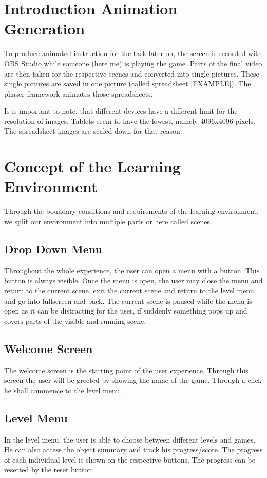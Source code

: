 \section{Introduction Animation Generation}\label{sec:introduction-animation-generation}
To produce animated instruction for the task later on,
the screen is recorded with OBS Studio while someone (here me) is playing the game.
Parts of the final video are then taken for the respective scenes and converted into single pictures.
These single pictures are saved in one picture (called spreadsheet [EXAMPLE]).
The phaser framework animates those spreadsheets.

Is is important to note, that different devices have a different limit for the resolution of images.
Tablets seem to have the lowest, namely 4096x4096 pixels.
The spreadsheet images are scaled down for that reason.

\section{Concept of the Learning Environment}\label{sec:concept-of-the-learning-environment}
Through the boundary conditions and requirements of the learning environment,
we split our environment into multiple parts or here called scenes.

\subsection{Drop Down Menu}\label{subsec:drop-down-menu}
Throughout the whole experience, the user can open a menu with a button.
This button is always visible.
Once the menu is open, the user may close the menu and return to the current scene,
exit the current scene and return to the level menu and go into fullscreen and back.
The current scene is paused while the menu is open as it can be distracting for the user,
if suddenly something pops up and covers parts of the visible and running scene.

\subsection{Welcome Screen}\label{subsec:welcome-screen}
The welcome screen is the starting point of the user experience.
Through this screen the user will be greeted by showing the name of the game.
Through a click he shall commence to the level menu.

\subsection{Level Menu}\label{subsec:level-menu}
In the level menu, the user is able to choose between different levels and games.
He can also access the object summary and track his progress/score.
The progress of each individual level is shown on the respective buttons.
The progress can be resetted by the reset button.

